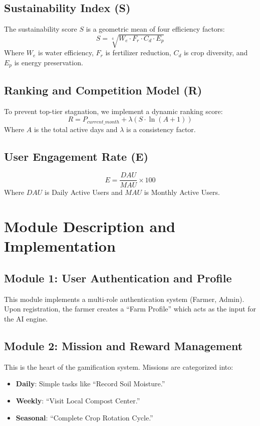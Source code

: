 \documentclass[journal]{IEEEtran}
\begin{document}
\subsection{Sustainability Index (S)}
The sustainability score $S$ is a geometric mean of four efficiency factors:
\begin{equation}
S = \sqrt[4]{W_e \cdot F_r \cdot C_d \cdot E_p}
\end{equation}
Where $W_e$ is water efficiency, $F_r$ is fertilizer reduction, $C_d$ is crop diversity, and $E_p$ is energy preservation.

\subsection{Ranking and Competition Model (R)}
To prevent top-tier stagnation, we implement a dynamic ranking score:
\begin{equation}
R = P_{current\_month} + \lambda (S \cdot \ln(A + 1))
\end{equation}
Where $A$ is the total active days and $\lambda$ is a consistency factor.

\subsection{User Engagement Rate (E)}
\begin{equation}
E = \frac{DAU}{MAU} \times 100
\end{equation}
Where $DAU$ is Daily Active Users and $MAU$ is Monthly Active Users.

\section{Module Description and Implementation}

\subsection{Module 1: User Authentication and Profile}
This module implements a multi-role authentication system (Farmer, Admin). Upon registration, the farmer creates a ``Farm Profile'' which acts as the input for the AI engine.

\subsection{Module 2: Mission and Reward Management}
This is the heart of the gamification system. Missions are categorized into:
\begin{itemize}
    \item \textbf{Daily}: Simple tasks like ``Record Soil Moisture.''
    \item \textbf{Weekly}: ``Visit Local Compost Center.''
    \item \textbf{Seasonal}: ``Complete Crop Rotation Cycle.''
\end{itemize}
\end{document}
